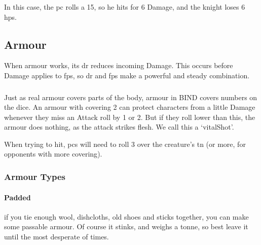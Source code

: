 \begin{multicols}{2}
{  In this case, the \gls{pc} rolls a 15, so he hits for 6 Damage, and the knight loses 6 \glspl{hp}.

}{

}

\subsection{Armour}



When armour works, its \gls{dr} reduces incoming Damage.
This occurs before Damage applies to \glspl{fp}, so \gls{dr} and \glspl{fp} make a powerful and steady combination.

\subsubsection{}
\label{vitals}
Just as real armour covers parts of the body, armour in BIND covers numbers on the dice.
An armour with \gls{covering} 2 can protect characters from a little Damage whenever they miss an Attack roll by 1 or 2.
But if they roll lower than this, the armour does nothing, as the attack strikes flesh.
We call this a `\gls{vitalShot}'.

When trying to hit, \glspl{pc} will need to roll 3 over the creature's \gls{tn} (or more, for opponents with more \gls{covering}).

\armourchart

\noindent
\subsubsection{Armour Types}

\paragraph{Padded}
if you tie enough wool, dishcloths, old shoes and sticks together, you can make some passable armour.
Of course it stinks, and weighs a tonne, so best leave it until the most desperate of times.


\end{multicols}
